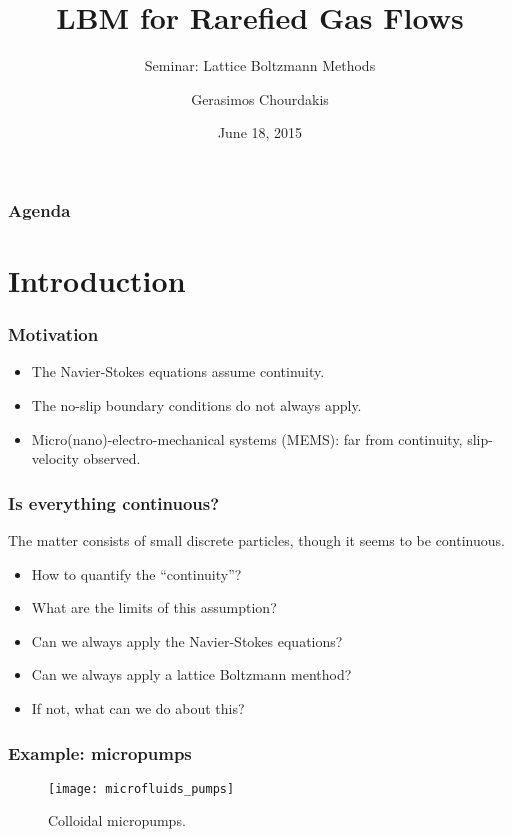 \documentclass{beamer}
\title{LBM for Rarefied Gas Flows}
\subtitle{Seminar: Lattice Boltzmann Methods}
\author{Gerasimos Chourdakis}
\institute[TUM Informatics]{Fakult\"at f\"ur Informatik - Technische Universit\"at M\"unchen}
\date{June 18, 2015}
\begin{document}
\begin{frame}
  \titlepage
\end{frame}

\begin{frame}
  \frametitle{Agenda}
  \tableofcontents
\end{frame}


\section{Introduction}

\begin{frame}
  \frametitle{Motivation}

  \begin{itemize}
   \item The Navier-Stokes equations assume continuity.
   \item The no-slip boundary conditions do not always apply. 
   \item Micro(nano)-electro-mechanical systems (MEMS): far from continuity, slip-velocity observed.
  \end{itemize}
\end{frame}

\begin{frame}
  \frametitle{Is everything continuous?}
  
  The matter consists of small discrete particles,
  though it seems to be continuous.

  \begin{itemize}
   \item How to quantify the ``continuity''?
   \item What are the limits of this assumption?
   \item Can we always apply the Navier-Stokes equations?
   \item Can we always apply a lattice Boltzmann menthod?
   \item If not, what can we do about this?
  \end{itemize}
\end{frame}

\begin{frame}
 \frametitle{Example: micropumps}
 \begin{figure}
  \texttt{[image: microfluids\_pumps]}
  \caption{Colloidal micropumps.\,\footnotemark}
 \end{figure}
\end{frame}
\end{document}
